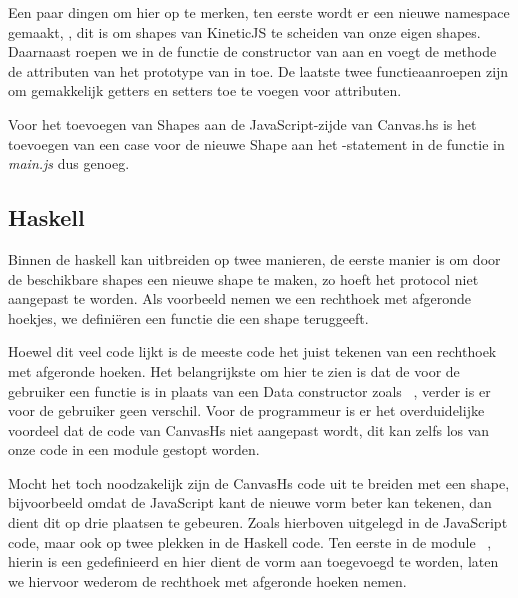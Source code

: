 Een paar dingen om hier op te merken, ten eerste wordt er een nieuwe namespace gemaakt, , dit is om shapes van KineticJS te scheiden van onze eigen shapes. Daarnaast roepen we in de  functie de constructor van  aan en voegt de  methode de attributen van het prototype van  in  toe. De laatste twee functieaanroepen zijn om gemakkelijk getters en setters toe te voegen voor attributen.

Voor het toevoegen van Shapes aan de JavaScript-zijde van Canvas.hs is het toevoegen van een case voor de nieuwe Shape aan het -statement in de  functie in \emph{main.js} dus genoeg.

\subsection{Haskell}

Binnen de haskell kan uitbreiden op twee manieren, de eerste manier is om door de beschikbare shapes een nieuwe shape te maken, zo hoeft het protocol niet aangepast te worden. Als voorbeeld nemen we een rechthoek met afgeronde hoekjes, we defini\"eren een functie  die een shape teruggeeft.



Hoewel dit veel code lijkt is de meeste code het juist tekenen van een rechthoek met afgeronde hoeken. Het belangrijkste om hier te zien is dat de  voor de gebruiker een functie is in plaats van een Data constructor zoals ~, verder is er voor de gebruiker geen verschil. Voor de programmeur is er het overduidelijke voordeel dat de code van CanvasHs niet aangepast wordt, dit kan zelfs los van onze code in een module gestopt worden.

Mocht het toch noodzakelijk zijn de CanvasHs code uit te breiden met een shape, bijvoorbeeld omdat de JavaScript kant de nieuwe vorm beter kan tekenen, dan dient dit op drie plaatsen te gebeuren. Zoals hierboven uitgelegd in de JavaScript code, maar ook op twee plekken in de Haskell code. Ten eerste in de module ~, hierin is een  gedefinieerd en hier dient de vorm aan toegevoegd te worden, laten we hiervoor wederom de rechthoek met afgeronde hoeken nemen.

